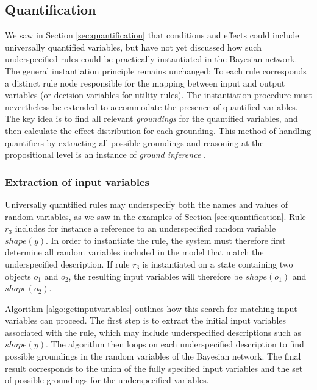 \subsection{Quantification}
\label{sec:applicationquantif}

We saw in Section \ref{sec:quantification} that conditions and effects could include universally quantified variables, but have not yet discussed how such underspecified rules could be practically instantiated in the Bayesian network. The general instantiation principle remains unchanged: To each rule corresponds a distinct rule node responsible for the mapping between input and output variables (or decision variables for utility rules). The instantiation procedure must nevertheless be extended to accommodate the presence of quantified variables.  The key idea is to find all relevant \textit{groundings} for the quantified variables, and then calculate the effect distribution for each grounding. This method of handling quantifiers by extracting all possible groundings and reasoning at the propositional level is an instance of \textit{ground inference} \citep{getoor:srlbook07}. 

\subsubsection*{Extraction of input variables}

Universally quantified rules may underspecify both the names and values of random variables, as we saw in the examples of Section \ref{sec:quantification}.  Rule $r_3$ includes for instance a reference to an underspecified random variable $\mathit{shape}(y)$.  In order to instantiate the rule, the system must therefore first determine all random variables included in the model that match the underspecified description. If rule $r_3$ is instantiated on a state containing two objects $o_1$ and $o_2$, the resulting input variables will therefore be $\mathit{shape}(o_1)$ and $\mathit{shape}(o_2)$. 

Algorithm \ref{algo:getinputvariables} outlines how this search for matching input variables can proceed. The first step is to extract the initial input variables associated with the rule, which may include underspecified descriptions such as $\mathit{shape}(y)$. The algorithm then loops on each underspecified description to find possible groundings in the random variables of the Bayesian network.  The final result corresponds to the union of the fully specified input variables and the set of possible groundings for the underspecified variables.  

